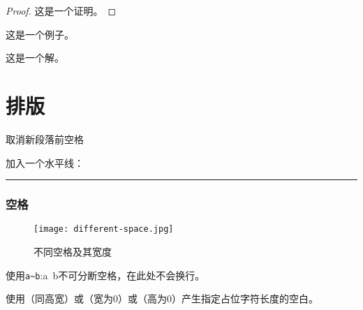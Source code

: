 \begin{proof}
  这是一个证明。
\end{proof}

\begin{example}
  这是一个例子。
\end{example}

\begin{solution}
  这是一个解。
\end{solution}



\section{排版}

\noindent  取消新段落前空格

加入一个水平线：

\noindent\rule{\textwidth}{0.5pt}

\subsubsection*{空格}

\begin{figure}[!htbp]
  \centering
  \texttt{[image: different-space.jpg]}
  \caption{不同空格及其宽度}
  \label{fig-diff-space}
\end{figure}


使用\verb|a~b|:a~b不可分断空格，在此处不会换行。

使用\phantom{text}（同高宽）或\vphantom{text}（宽为0）或\hphantom{text}（高为0）产生指定占位字符长度的空白。
